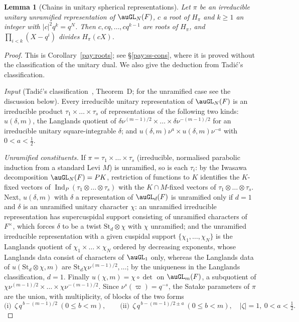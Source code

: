 \documentclass[10pt]{amsart}
\newtheorem{lemma}[theorem]{Lemma}
\theoremstyle{definition}
\theoremstyle{remark}
\begin{document}
\begin{lemma}[Chains in unitary spherical representations]\label{pax:tadic}
Let $\pi$ be an irreducible unitary unramified representation of $\auGL_N(F)$, $c$ a root of
$H_\pi$ and $k\ge1$ an integer with $|c|^2q^{k}=q^N$. Then $c,cq,\dots,cq^{k-1}$ are roots of
$H_\pi$, and $\prod_{i<k}(X-q^i)$ divides $H_\pi(cX)$.
\end{lemma}

\begin{proof}
This is Corollary~\ref{pay:roots}; see \S\ref{pay:ss-cons}, where it is proved without the
classification of the unitary dual. We also give the deduction from Tadi\'c's classification.

\emph{Input} (Tadi\'c's classification~\cite{TadicENS}, Theorem~D; for the
unramified case see the discussion below). Every irreducible unitary representation of $\auGL_N(F)$
is an irreducible product $\tau_1\times\dots\times\tau_s$ of representations of the following two
kinds: $u(\delta,m)$, the Langlands quotient of $\delta\nu^{(m-1)/2}\times\dots\times\delta\nu^{-(m-1)/2}$
for an irreducible unitary square-integrable $\delta$; and $u(\delta,m)\nu^a\times u(\delta,m)\nu^{-a}$
with $0<a<\frac12$.

\emph{Unramified constituents.} If $\pi=\tau_1\times\dots\times\tau_s$ (irreducible, normalised
parabolic induction from a standard Levi $M$) is unramified, so is each $\tau_i$: by the Iwasawa
decomposition $\auGL_N(F)=P K$, restriction of functions to $K$ identifies the $K$-fixed vectors of
$\operatorname{Ind}_P(\tau_1\otimes\dots\otimes\tau_s)$ with the $K\cap M$-fixed vectors of
$\tau_1\otimes\dots\otimes\tau_s$. Next, $u(\delta,m)$ with $\delta$ a representation of $\auGL_d(F)$ is
unramified only if $d=1$ and $\delta$ is an unramified unitary character $\chi$: an unramified
irreducible representation has supercuspidal support consisting of unramified characters of $F^\times$,
which forces $\delta$ to be a twist $\mathrm{St}_d\otimes\chi$ with $\chi$ unramified; and the
unramified irreducible representation with a given cuspidal support $\{\chi_1,\dots,\chi_N\}$ is the
Langlands quotient of $\chi_{1}\times\dots\times\chi_{N}$ ordered by decreasing exponents, whose
Langlands data consist of characters of $\auGL_1$ only, whereas the Langlands data of $u(\mathrm{St}_d
\otimes\chi,m)$ are $\mathrm{St}_d\chi\nu^{(m-1)/2},\dots$; by the uniqueness in the Langlands
classification, $d=1$. Finally $u(\chi,m)=\chi\circ\det$ on $\auGL_m(F)$, a subquotient of $\chi\nu^{(m-1)/2}\times
\dots\times\chi\nu^{-(m-1)/2}$. Since $\nu^s(\varpi)=q^{-s}$, the Satake parameters of $\pi$ are the
union, with multiplicity, of blocks of the two forms
\[
\text{(i)}\ \ \zeta\,q^{\,b-(m-1)/2}\ (0\le b<m),\qquad\text{(ii)}\ \ \zeta\,q^{\,b-(m-1)/2\pm a}\
(0\le b<m),\quad|\zeta|=1,\ 0<a<\tfrac12 .
\]


\end{proof}
\end{document}
